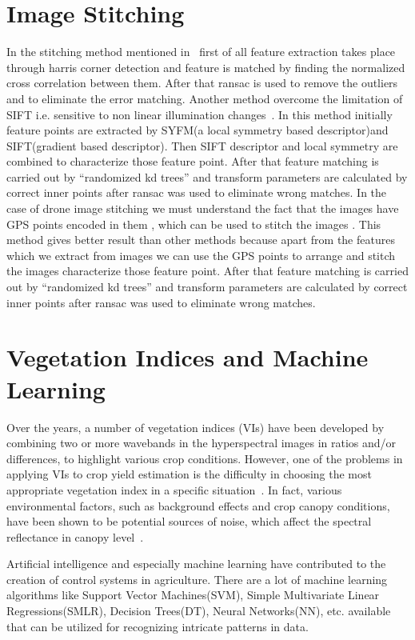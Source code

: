 \section{Image Stitching}
In the stitching method mentioned in~\cite{chen2014image} first of all feature extraction takes place through harris corner detection and feature is matched by finding the normalized cross correlation between them. After that ransac is used to remove the outliers and to eliminate the error matching. Another method overcome the limitation of SIFT i.e. sensitive to non linear illumination changes~\cite{yang2014image}. In this method initially feature points are extracted by SYFM(a local symmetry based descriptor)and SIFT(gradient based descriptor). Then SIFT descriptor and local symmetry are combined to characterize those feature point. After that feature matching is carried out by ``randomized kd trees'' and transform parameters are calculated by correct inner points after ransac was used to eliminate wrong matches. In the case of drone image stitching we must understand the fact that the images have GPS points encoded in them , which can be used to stitch the images . This method gives better result than other methods because apart from the features which we extract from images we can use the GPS points to arrange and stitch the images characterize those feature point. After that feature matching is carried out by ``randomized kd trees'' and transform parameters are calculated by correct inner points after ransac was used to eliminate wrong matches.

\section{Vegetation Indices and Machine Learning}
Over the years, a number of vegetation indices (VIs) have been developed by combining two or more wavebands in the hyperspectral images in ratios and/or differences, to highlight various crop conditions. However, one of the problems in applying VIs to crop yield estimation is the difficulty in choosing the most appropriate vegetation index in a specific situation~\cite{barrett1999fractional}. In fact, various environmental factors, such as background effects and crop canopy conditions, have been shown to be potential sources of noise, which affect the spectral reflectance in canopy level~\cite{aparicio2000spatial}.

Artificial intelligence and especially machine learning have contributed to the creation of control systems in agriculture. There are a lot of machine learning algorithms like Support Vector Machines(SVM), Simple Multivariate Linear Regressions(SMLR), Decision Trees(DT), Neural Networks(NN), etc. available that can be utilized for recognizing intricate patterns in data.

